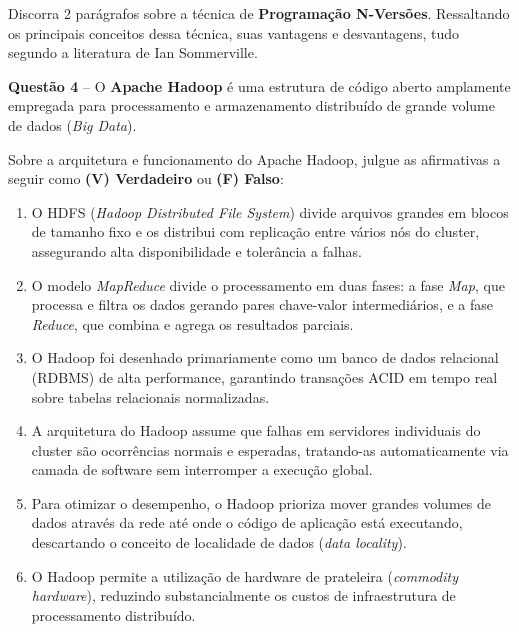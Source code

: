 \documentclass[12pt,a4paper]{article}
\newcommand{\resposta}[1]{
\noindent
\framebox[\textwidth]{
\begin{minipage}{0.98\textwidth}
\vspace*{#1}\null
\end{minipage}
}
}
\begin{document}
Discorra 2 parágrafos sobre a técnica de \textbf{Programação N-Versões}. Ressaltando os principais conceitos dessa técnica, suas vantagens e desvantagens, tudo segundo a literatura de Ian Sommerville.
\vspace{0.2cm}
\resposta{7cm}

\vspace{0.5cm}

\textbf{Questão 4} -- O \textbf{Apache Hadoop} é uma estrutura de código aberto amplamente empregada para processamento e armazenamento distribuído de grande volume de dados (\textit{Big Data}).

\vspace{0.2cm}

Sobre a arquitetura e funcionamento do Apache Hadoop, julgue as afirmativas a seguir como \textbf{(V) Verdadeiro} ou \textbf{(F) Falso}:

\vspace{0.3cm}

\begin{enumerate}[label=\textbf{(\hspace{0.6cm})} ,leftmargin=2cm]
    \item O HDFS (\textit{Hadoop Distributed File System}) divide arquivos grandes em blocos de tamanho fixo e os distribui com replicação entre vários nós do cluster, assegurando alta disponibilidade e tolerância a falhas.

    \item O modelo \textit{MapReduce} divide o processamento em duas fases: a fase \textit{Map}, que processa e filtra os dados gerando pares chave-valor intermediários, e a fase \textit{Reduce}, que combina e agrega os resultados parciais.

    \item O Hadoop foi desenhado primariamente como um banco de dados relacional (RDBMS) de alta performance, garantindo transações ACID em tempo real sobre tabelas relacionais normalizadas.

    \item A arquitetura do Hadoop assume que falhas em servidores individuais do cluster são ocorrências normais e esperadas, tratando-as automaticamente via camada de software sem interromper a execução global.

    \item Para otimizar o desempenho, o Hadoop prioriza mover grandes volumes de dados através da rede até onde o código de aplicação está executando, descartando o conceito de localidade de dados (\textit{data locality}).

    \item O Hadoop permite a utilização de hardware de prateleira (\textit{commodity hardware}), reduzindo substancialmente os custos de infraestrutura de processamento distribuído.
\end{enumerate}
\end{document}

